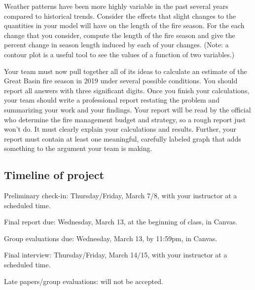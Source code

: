 \documentclass[11pt]{article}\usepackage[]{graphicx}\usepackage[]{color}
\begin{document}
\begin{compactitem}
        \item Weather patterns have been more highly variable in the past several years
        compared to historical trends. Consider the effects that slight changes to the
        quantities in your model will have on the length of the fire season. For the
        each change that you consider, compute the length of the fire season and give the
        percent change in season length induced by each of your changes. (Note: a contour
        plot is a useful tool to see the values of a function of two variables.)

    \end{compactitem}


    Your team must now pull together all of its ideas to calculate an estimate
    of the Great Basin fire season in 2019 under several possible conditions. You
    should report all answers with three significant digits. Once you finish
    your calculations, your team should write a professional report restating
    the problem and summarizing your work and your findings. Your report will be
    read by the official who determine the fire management budget and strategy, so
    a rough report just won't do. It must clearly explain your calculations and
    results. Further, your report must contain at least one
    meaningful, carefully labeled graph that adds something to the argument
    your team is making.


\subsection*{Timeline of project}

\begin{compactdesc}
    \item[Preliminary check-in:] Thursday/Friday, March 7/8, with your
    instructor at a scheduled time.
    \item[Final report due:] Wednesday, March 13, at the beginning of
    class, in Canvas.
    \item[Group evaluations due:]  Wednesday, March 13, by 11:59pm, in
    Canvas.
    \item[Final interview:] Thursday/Friday, March 14/15, with your
    instructor at a scheduled time.
    \item[Late papers/group evaluations:] will not be accepted.
\end{compactdesc}
\end{document}

